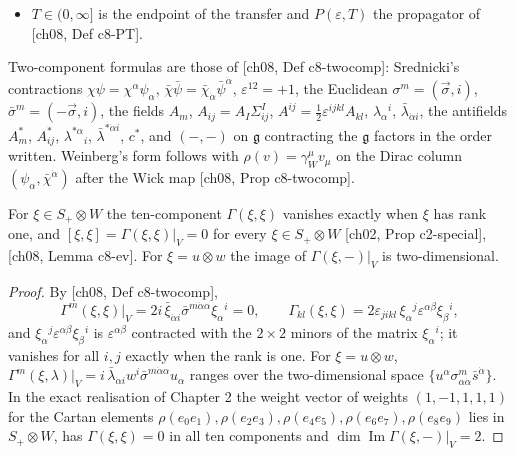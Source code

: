 \begin{definition}[Names]
\begin{itemize}
\item $T\in(0,\infty]$ is the endpoint of the transfer and $P(\varepsilon,T)$ the propagator of [ch08, Def c8-PT].
\end{itemize}
Two-component formulas are those of [ch08, Def c8-twocomp]: Srednicki's contractions $\chi\psi=\chi^\alpha\psi_\alpha$, $\bar\chi\bar\psi=\bar\chi_{\dot\alpha}\bar\psi^{\dot\alpha}$, $\varepsilon^{12}=+1$, the Euclidean $\sigma^m=(\vec\sigma,i)$, $\bar\sigma^m=(-\vec\sigma,i)$, the fields $A_m$, $A_{ij}=A_I\Sigma^I_{ij}$, $A^{ij}=\tfrac12\varepsilon^{ijkl}A_{kl}$, $\lambda_\alpha{}^i$, $\bar\lambda_{\dot\alpha i}$, the antifields $A^*_m$, $A^*_{ij}$, $\lambda^{*\alpha}{}_i$, $\bar\lambda^{*\dot\alpha i}$, $c^*$, and $(-,-)$ on $\mathfrak g$ contracting the $\mathfrak g$ factors in the order written. Weinberg's form follows with $\rho(v)=\gamma_W^\mu v_\mu$ on the Dirac column $(\psi_\alpha,\bar\chi^{\dot\alpha})$ after the Wick map [ch08, Prop c8-twocomp].
\end{definition}

\begin{lemma}
\label{lem:o-rankone}
For $\xi\in S_+\otimes W$ the ten-component $\Gamma(\xi,\xi)$ vanishes exactly when $\xi$ has rank one, and $[\xi,\xi]=\Gamma(\xi,\xi)|_V=0$ for every $\xi\in S_+\otimes W$ [ch02, Prop c2-special], [ch08, Lemma c8-ev]. For $\xi=u\otimes w$ the image of $\Gamma(\xi,-)|_V$ is two-dimensional.
\end{lemma}

\begin{proof}
By [ch08, Def c8-twocomp],
\[
\Gamma^m(\xi,\xi)\big|_V=2i\,\bar\xi_{\dot\alpha i}\bar\sigma^{m\dot\alpha\alpha}\xi_\alpha{}^i=0,\qquad \Gamma_{kl}(\xi,\xi)=2\varepsilon_{jikl}\,\xi_\alpha{}^j\varepsilon^{\alpha\beta}\xi_\beta{}^i ,
\]
and $\xi_\alpha{}^j\varepsilon^{\alpha\beta}\xi_\beta{}^i$ is $\varepsilon^{\alpha\beta}$ contracted with the $2\times2$ minors of the matrix $\xi_\alpha{}^i$; it vanishes for all $i,j$ exactly when the rank is one. For $\xi=u\otimes w$, $\Gamma^m(\xi,\lambda)|_V=i\,\bar\lambda_{\dot\alpha i}w^i\bar\sigma^{m\dot\alpha\alpha}u_\alpha$ ranges over the two-dimensional space $\{u^\alpha\sigma^m_{\alpha\dot\alpha}\bar s^{\dot\alpha}\}$. In the exact realisation of Chapter 2 the weight vector of weights $(1,-1,1,1,1)$ for the Cartan elements $\rho(e_0e_1),\rho(e_2e_3),\rho(e_4e_5),\rho(e_6e_7),\rho(e_8e_9)$ lies in $S_+\otimes W$, has $\Gamma(\xi,\xi)=0$ in all ten components and $\dim\operatorname{Im}\Gamma(\xi,-)|_V=2$.
\end{proof}

